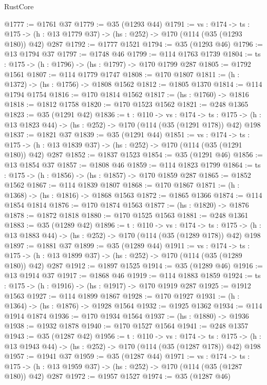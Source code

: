 \begin{lexlean}{RustCore}
\begin{coremodule}
@1777 := @1761 @37
@1779 := @35 (@1293 @44)
@1791 := {vs : @174} ->
  {ts : @175} -> (h : @13 @1779 @37) -> (hs : @252) -> @170 (@114 (@35 (@1293 @180)) @42) @287
@1792 := @1777 @1521
@1794 := @35 (@1293 @46)
@1796 := @13 @1794 @37
@1797 := @1748 @46
@1799 := @114 @1763 @1739
@1804 := {ts : @175} -> (h : @1796) -> (hs : @1797) -> @170 @1799 @287
@1805 := @1792 @1561
@1807 := @114 @1779 @1747
@1808 := @170 @1807
@1811 := (h : @1372) -> (hs : @1756) -> @1808 @1562
@1812 := @1805 @1370
@1814 := @114 @1794 @1754
@1816 := @170 @1814 @1562
@1817 := (hs : @1760) -> @1816
@1818 := @1812 @1758
@1820 := @170 @1523 @1562
@1821 := @248 @1365
@1823 := @35 (@1291 @42)
@1836 := {t : @110} ->
  {vs : @174} ->
  {ts : @175} -> (h : @13 @1823 @44) -> (hs : @252) -> @170 (@114 (@35 (@1291 @178)) @42) @198
@1837 := @1821 @37
@1839 := @35 (@1291 @44)
@1851 := {vs : @174} ->
  {ts : @175} -> (h : @13 @1839 @37) -> (hs : @252) -> @170 (@114 (@35 (@1291 @180)) @42) @287
@1852 := @1837 @1523
@1854 := @35 (@1291 @46)
@1856 := @13 @1854 @37
@1857 := @1808 @46
@1859 := @114 @1823 @1799
@1864 := {ts : @175} -> (h : @1856) -> (hs : @1857) -> @170 @1859 @287
@1865 := @1852 @1562
@1867 := @114 @1839 @1807
@1868 := @170 @1867
@1871 := (h : @1368) -> (hs : @1816) -> @1868 @1563
@1872 := @1865 @1366
@1874 := @114 @1854 @1814
@1876 := @170 @1874 @1563
@1877 := (hs : @1820) -> @1876
@1878 := @1872 @1818
@1880 := @170 @1525 @1563
@1881 := @248 @1361
@1883 := @35 (@1289 @42)
@1896 := {t : @110} ->
  {vs : @174} ->
  {ts : @175} -> (h : @13 @1883 @44) -> (hs : @252) -> @170 (@114 (@35 (@1289 @178)) @42) @198
@1897 := @1881 @37
@1899 := @35 (@1289 @44)
@1911 := {vs : @174} ->
  {ts : @175} -> (h : @13 @1899 @37) -> (hs : @252) -> @170 (@114 (@35 (@1289 @180)) @42) @287
@1912 := @1897 @1525
@1914 := @35 (@1289 @46)
@1916 := @13 @1914 @37
@1917 := @1868 @46
@1919 := @114 @1883 @1859
@1924 := {ts : @175} -> (h : @1916) -> (hs : @1917) -> @170 @1919 @287
@1925 := @1912 @1563
@1927 := @114 @1899 @1867
@1928 := @170 @1927
@1931 := (h : @1364) -> (hs : @1876) -> @1928 @1564
@1932 := @1925 @1362
@1934 := @114 @1914 @1874
@1936 := @170 @1934 @1564
@1937 := (hs : @1880) -> @1936
@1938 := @1932 @1878
@1940 := @170 @1527 @1564
@1941 := @248 @1357
@1943 := @35 (@1287 @42)
@1956 := {t : @110} ->
  {vs : @174} ->
  {ts : @175} -> (h : @13 @1943 @44) -> (hs : @252) -> @170 (@114 (@35 (@1287 @178)) @42) @198
@1957 := @1941 @37
@1959 := @35 (@1287 @44)
@1971 := {vs : @174} ->
  {ts : @175} -> (h : @13 @1959 @37) -> (hs : @252) -> @170 (@114 (@35 (@1287 @180)) @42) @287
@1972 := @1957 @1527
@1974 := @35 (@1287 @46)

\end{coremodule}
\end{lexlean}
